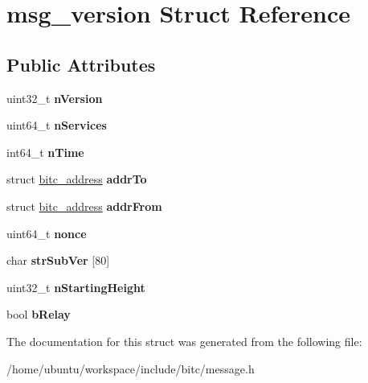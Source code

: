 \hypertarget{structmsg__version}{\section{msg\-\_\-version Struct Reference}
\label{structmsg__version}
}
\subsection*{Public Attributes}
\begin{DoxyCompactItemize}
\item 
\hypertarget{structmsg__version_ad6fae9596aaa57ce98f2bc0866a31b61}{uint32\-\_\-t {\bfseries n\-Version}}\label{structmsg__version_ad6fae9596aaa57ce98f2bc0866a31b61}

\item 
\hypertarget{structmsg__version_a3ea80e2dc1acdc13b1730672171894cc}{uint64\-\_\-t {\bfseries n\-Services}}\label{structmsg__version_a3ea80e2dc1acdc13b1730672171894cc}

\item 
\hypertarget{structmsg__version_a93a89276795da0fcb1f31ce0b95b3c26}{int64\-\_\-t {\bfseries n\-Time}}\label{structmsg__version_a93a89276795da0fcb1f31ce0b95b3c26}

\item 
\hypertarget{structmsg__version_ac9a92fb0c76653c364df5be4c6e76039}{struct \hyperlink{structbitc__address}{bitc\-\_\-address} {\bfseries addr\-To}}\label{structmsg__version_ac9a92fb0c76653c364df5be4c6e76039}

\item 
\hypertarget{structmsg__version_a03b882873204e7bac660994bc2d7beb6}{struct \hyperlink{structbitc__address}{bitc\-\_\-address} {\bfseries addr\-From}}\label{structmsg__version_a03b882873204e7bac660994bc2d7beb6}

\item 
\hypertarget{structmsg__version_a6f8eb300477d9b2e8826d4d7b1315dc0}{uint64\-\_\-t {\bfseries nonce}}\label{structmsg__version_a6f8eb300477d9b2e8826d4d7b1315dc0}

\item 
\hypertarget{structmsg__version_ad483ea965fe4866bd98307f0eefb717a}{char {\bfseries str\-Sub\-Ver} \mbox{[}80\mbox{]}}\label{structmsg__version_ad483ea965fe4866bd98307f0eefb717a}

\item 
\hypertarget{structmsg__version_a0f0ea2db22e765843228dcd9541e822e}{uint32\-\_\-t {\bfseries n\-Starting\-Height}}\label{structmsg__version_a0f0ea2db22e765843228dcd9541e822e}

\item 
\hypertarget{structmsg__version_a94551b97cf33fc93dfdaf14d0d5537db}{bool {\bfseries b\-Relay}}\label{structmsg__version_a94551b97cf33fc93dfdaf14d0d5537db}

\end{DoxyCompactItemize}


The documentation for this struct was generated from the following file\-:\begin{DoxyCompactItemize}
\item 
/home/ubuntu/workspace/include/bitc/message.\-h\end{DoxyCompactItemize}
